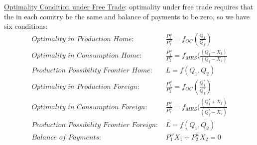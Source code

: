 \documentclass{article}
\begin{document}
\underline{Optimality Condition under Free Trade}: optimality under free trade requires that the  in each country be the same and balance of payments to be zero, so we have six conditions:
\begin{align*}
  \textit{Optimality in Production Home: }& \tfrac{P_{1}^{w}}{P_{2}^{w}} = f_{OC}(\tfrac{Q_{1}}{Q_{f}}) \\
  \textit{Optimality in Consumption Home: }& \tfrac{P_{1}^{w}}{P_{2}^{w}} = f_{MRS}(\tfrac{(Q_{1}-X_{1})}{(Q_{f}-X_{2})} \\
  \textit{Production Possibility Frontier Home: }& L = f(Q_{1}, Q_{2}) \\
  \textit{Optimality in Production Foreign: }& \tfrac{P_{1}^{w}}{P_{2}^{w}} = f_{OC}(\tfrac{Q_{1}^{*}}{Q_{f}^{*}}) \\
  \textit{Optimality in Consumption Foreign: }& \tfrac{P_{1}^{w}}{P_{2}^{w}} = f_{MRS}(\tfrac{(Q_{1}^{*}+X_{1})}{(Q_{f}^{*}-X_{2})} \\
  \textit{Production Possibility Frontier Foreign: }& L = f(Q_{1}, Q_{2}) \\
  \textit{Balance of Payments: }& P_{1}^{w}X_{1} + P_{2}^{w}X_{2} = 0
\end{align*}

\newpage
\end{document}
